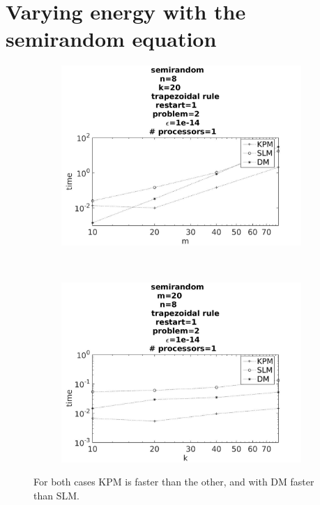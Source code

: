 \section{Varying energy with the semirandom equation}

\begin{figure}[H]
        \centering
        \begin{subfigure}[b]{0.45\textwidth}
                \includegraphics[width=\textwidth]{../MATLAB/fig/vsresulttimem.jpg}
                \caption{  }
                \label{fig:vsresulttimem}
        \end{subfigure}
        ~
        \begin{subfigure}[b]{0.45\textwidth}
                \includegraphics[width=\textwidth]{../MATLAB/fig/vsresulttimek.jpg}
                \caption{  }
                \label{fig:vsresulttimek}
        \end{subfigure}
        \caption{ For both cases KPM is faster than the other, and with DM faster than SLM.  }
        \label{fig:vsresulttime}
\end{figure}



